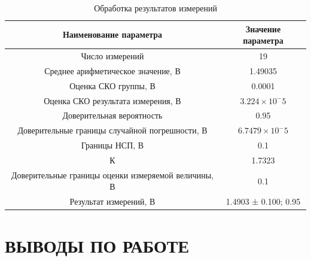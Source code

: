 \documentclass[a4paper,14pt]{article}
\begin{document}
\begin{table}[H]
	\centering
	\caption{Обработка результатов измерений }
	\label{tab:mm_train}
	\begin{tabular}{|c|c|}
		\hline
		              Наименование параметра                &  Значение параметра   \\ \hline
		                  Число измерений                   &          19           \\ \hline
		        Среднее арифметическое значение, В          &        1.49035        \\ \hline
		               Оценка СКО группы, В                 &        0.0001         \\ \hline
		        Оценка СКО результата измерения, В          & $3.224 \times 10^-5$  \\ \hline
		             Доверительная вероятность              &         0.95          \\ \hline
		  Доверительные границы случайной погрешности, В    & $6.7479 \times 10^-5$ \\ \hline
		                  Границы НСП, В                    &          0.1          \\ \hline
		                         К                          &        1.7323         \\ \hline
		Доверительные границы оценки измеряемой величины, В &          0.1          \\ \hline
		              Результат измерений, В                & 1.4903 ± 0.100; 0.95  \\ \hline
	\end{tabular}
\end{table}
\section{ВЫВОДЫ ПО РАБОТЕ}
\end{document}
